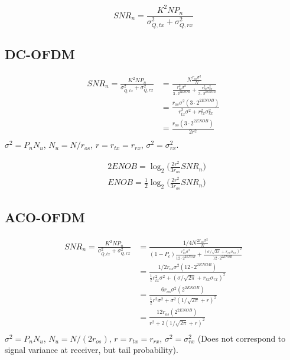 \documentclass[a4paper]{article}
\begin{document}
\begin{equation} \nonumber
SNR_n = \frac{K^2NP_n}{\sigma_{Q,tx}^2 + \sigma_{Q,rx}^2}
\end{equation}

\subsection{DC-OFDM}
\begin{align}
SNR_n = \frac{K^2NP_n}{\sigma_{Q,tx}^2 + \sigma_{Q,rx}^2}
& = \frac{N\frac{r_{os}\sigma^2}{N}}{\frac{r_{tx}^2\sigma^2}{3\cdot 2^{2ENOB}} + \frac{r_{rx}^2\sigma_{rx}^2}{3\cdot 2^{2ENOB}}} \\ \nonumber
& = \frac{r_{os}\sigma^2(3\cdot 2^{2ENOB})}{r_{tx}^2\sigma^2 + r_{rx}^2\sigma_{rx}^2} \\ \nonumber
& = \frac{r_{os}(3\cdot 2^{2ENOB})}{2r^2} \\ \nonumber
\end{align}
$\sigma^2 = P_nN_u$, $N_u = N/r_{os}$, $r = r_{tx} = r_{rx}$, $\sigma^2 = \sigma_{rx}^2$.

\begin{align} \nonumber
& 2ENOB = \log_2\bigg(\frac{2r^2}{3r_{os}}SNR_n\bigg) \\
& ENOB = \frac{1}{2}\log_2\bigg(\frac{2r^2}{3r_{os}}SNR_n\bigg)
\end{align}

\subsection{ACO-OFDM}
\begin{align} \nonumber
SNR_n = \frac{K^2NP_n}{\sigma_{Q,tx}^2 + \sigma_{Q,rx}^2} &= \frac{1/4N\frac{2r_{os}\sigma^2}{N}}{(1-P_c)\frac{r_{tx}^2\sigma^2}{12\cdot 2^{2ENOB}} + \frac{(\sigma/\sqrt{2\pi} + r_{rx}\sigma_{rx})^2}{12\cdot 2^{2ENOB}}} \\ \nonumber
&= \frac{1/2r_{os}\sigma^2({12\cdot 2^{2ENOB}})}{\frac{1}{2}r_{tx}^2\sigma^2 + (\sigma/\sqrt{2\pi} + r_{rx}\sigma_{rx})^2} \\ \nonumber
&= \frac{6r_{os}\sigma^2(2^{2ENOB})}{\frac{1}{2}r^2\sigma^2 + \sigma^2(1/\sqrt{2\pi} + r)^2} \\ \nonumber
&= \frac{12r_{os}(2^{2ENOB})}{r^2 + 2(1/\sqrt{2\pi} + r)^2} \\ \nonumber
\end{align}
$\sigma^2 = P_nN_u$, $N_u = N/(2r_{os})$, $r = r_{tx} = r_{rx}$, $\sigma^2 = \sigma_{rx}^2$ (Does not correspond to signal variance at receiver, but tail probability).
\end{document}
